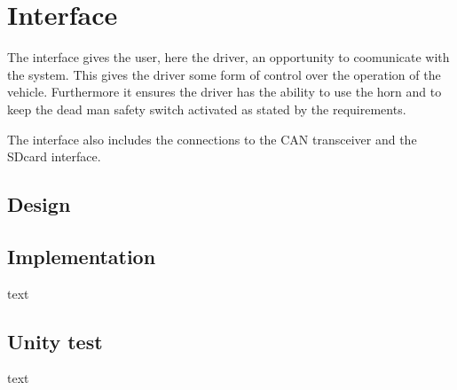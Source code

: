 \section{Interface}
The interface gives the user, here the driver, an opportunity to coomunicate with the system. This gives the driver some form of control over the operation of the vehicle. Furthermore it ensures the driver has the ability to use the horn and to keep the dead man safety switch activated as stated by the requirements.

The interface also includes the  connections to the CAN transceiver and the SDcard interface.  
\subsection{Design}


\subsection{Implementation}
text

\subsection{Unity test}
text